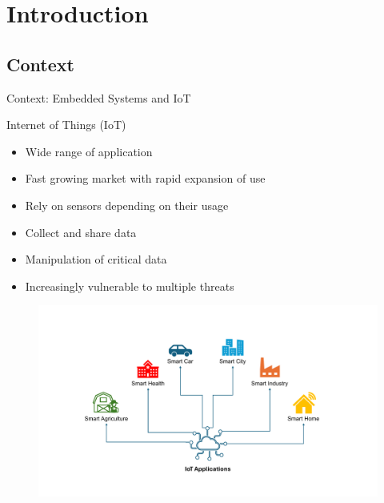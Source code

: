 \section{Introduction}

\subsection{Context}
\begin{frame}{Context: Embedded Systems and IoT}
	\begin{minipage}[c]{0.5\textwidth}
        \begin{block}{Internet of Things (IoT)}
            \begin{itemize}
                [square]
                \justifying
                \item Wide range of application
                \item Fast growing market with rapid expansion of use
                \item Rely on sensors depending on their usage
                \item Collect and share data
                \item Manipulation of critical data
                \item Increasingly vulnerable to multiple threats
            \end{itemize}
        \end{block}
	\end{minipage}\hfill%
	\begin{minipage}[c]{0.5\textwidth}
		\begin{figure}
			\centering
			\includegraphics[width=.825\textwidth, trim={4.5cm 2.25cm 5.75cm 3.25cm}, clip]{src/1_introduction/img/iotapplications.pdf}
			\label{fig:iot_application}

\end{figure}
\end{minipage}
\end{frame}
